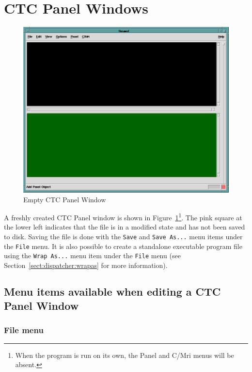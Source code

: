 \section{CTC Panel Windows}

\begin{figure}[hbpt]
\begin{centering}
\includegraphics[width=5in]{DISPEmptyCTCPanel.png}
\caption{Empty CTC Panel Window}
\label{fig:dispatcher:emptyCTCPanel}
\end{centering}
\end{figure}
A freshly created CTC Panel window is shown in
Figure~\ref{fig:dispatcher:emptyCTCPanel}\footnote{When the program is
run on its own, the Panel and C/Mri menus will be absent.}. The pink
square at the lower left indicates that the file is in a modified state
and has not been saved to disk.  Saving the file is done with the
\verb=Save= and \verb=Save As...= menu items under the \verb=File= menu.
It is also possible to create a standalone executable program file using
the \verb=Wrap As...= menu item under the \verb=File= menu (see
Section~\ref{sect:dispatcher:wrapas} for more information).

\subsection{Menu items available when editing a CTC Panel Window}

\subsubsection{File menu}

